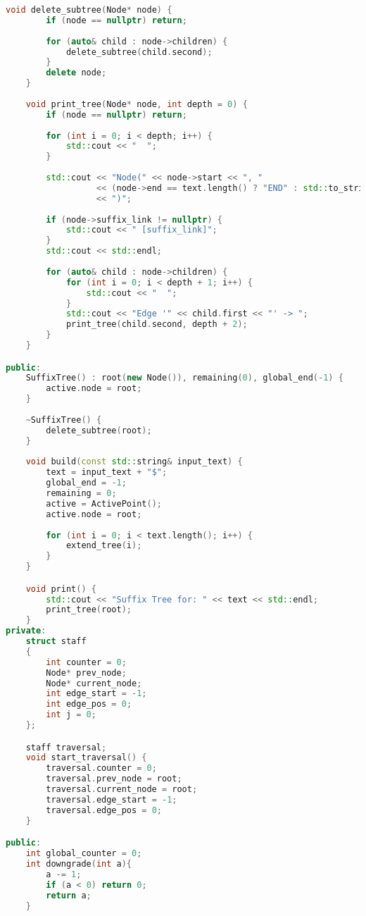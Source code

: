 \begin{lstlisting}[language=C++]
    void delete_subtree(Node* node) {
        if (node == nullptr) return;
        
        for (auto& child : node->children) {
            delete_subtree(child.second);
        }
        delete node;
    }
    
    void print_tree(Node* node, int depth = 0) {
        if (node == nullptr) return;
        
        for (int i = 0; i < depth; i++) {
            std::cout << "  ";
        }
        
        std::cout << "Node(" << node->start << ", " 
                  << (node->end == text.length() ? "END" : std::to_string(node->end)) 
                  << ")";
        
        if (node->suffix_link != nullptr) {
            std::cout << " [suffix_link]";
        }
        std::cout << std::endl;
        
        for (auto& child : node->children) {
            for (int i = 0; i < depth + 1; i++) {
                std::cout << "  ";
            }
            std::cout << "Edge '" << child.first << "' -> ";
            print_tree(child.second, depth + 2);
        }
    }

public:
    SuffixTree() : root(new Node()), remaining(0), global_end(-1) {
        active.node = root;
    }
    
    ~SuffixTree() {
        delete_subtree(root);
    }
   
    void build(const std::string& input_text) {
        text = input_text + "$";
        global_end = -1;
        remaining = 0;
        active = ActivePoint();
        active.node = root;
        
        for (int i = 0; i < text.length(); i++) {
            extend_tree(i);
        }
    }

    void print() {
        std::cout << "Suffix Tree for: " << text << std::endl;
        print_tree(root);
    }
private:
    struct staff
    {
        int counter = 0;
        Node* prev_node;
        Node* current_node;
        int edge_start = -1;
        int edge_pos = 0;
        int j = 0;
    };

    staff traversal;
    void start_traversal() {
        traversal.counter = 0;
        traversal.prev_node = root;
        traversal.current_node = root;
        traversal.edge_start = -1;
        traversal.edge_pos = 0;
    }

public:
    int global_counter = 0;
    int downgrade(int a){
        a -= 1;
        if (a < 0) return 0;
        return a;
    }


\end{lstlisting}

